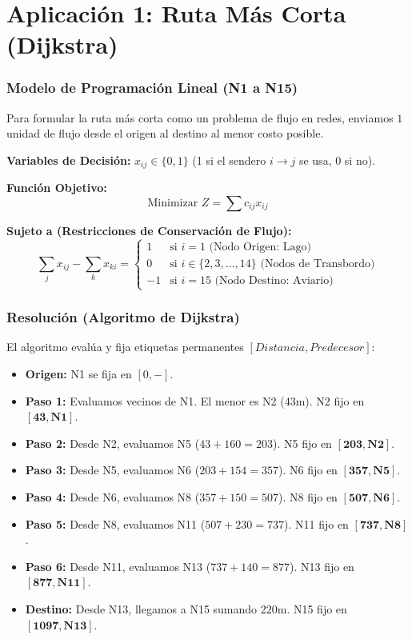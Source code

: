 \documentclass[aspectratio=169]{beamer}
\begin{document}
\section{Aplicación 1: Ruta Más Corta (Dijkstra)}

\begin{frame}
    \frametitle{Modelo de Programación Lineal (N1 a N15)}
    Para formular la ruta más corta como un problema de flujo en redes, 
    enviamos $1$ unidad de flujo desde el origen al destino al menor costo posible.
    
    \vspace{0.2cm}
    \textbf{Variables de Decisión:} $x_{ij} \in \{0,1\}$ (1 si el sendero $i \rightarrow j$ se usa, 0 si no).
    
    \textbf{Función Objetivo:}
    $$\text{Minimizar } Z = \sum c_{ij} x_{ij}$$
    
    \textbf{Sujeto a (Restricciones de Conservación de Flujo):}
    \begin{equation*}
    \sum_{j} x_{ij} - \sum_{k} x_{ki} = 
    \begin{cases} 
      1 & \text{si } i = 1 \text{ (Nodo Origen: Lago)} \\
      0 & \text{si } i \in \{2, 3, \dots, 14\} \text{ (Nodos de Transbordo)} \\
     -1 & \text{si } i = 15 \text{ (Nodo Destino: Aviario)}
    \end{cases}
    \end{equation*}
\end{frame}

\begin{frame}
    \frametitle{Resolución (Algoritmo de Dijkstra)}
    El algoritmo evalúa y fija etiquetas permanentes $[Distancia, Predecesor]$:
    \begin{itemize}
        \item \textbf{Origen:} N1 se fija en $[0, -]$.
        \item \textbf{Paso 1:} Evaluamos vecinos de N1. El menor es N2 (43m). N2 fijo en $\mathbf{[43, N1]}$.
        \item \textbf{Paso 2:} Desde N2, evaluamos N5 ($43+160=203$). N5 fijo en $\mathbf{[203, N2]}$.
        \item \textbf{Paso 3:} Desde N5, evaluamos N6 ($203+154=357$). N6 fijo en $\mathbf{[357, N5]}$.
        \item \textbf{Paso 4:} Desde N6, evaluamos N8 ($357+150=507$). N8 fijo en $\mathbf{[507, N6]}$.
        \item \textbf{Paso 5:} Desde N8, evaluamos N11 ($507+230=737$). N11 fijo en $\mathbf{[737, N8]}$.
        \item \textbf{Paso 6:} Desde N11, evaluamos N13 ($737+140=877$). N13 fijo en $\mathbf{[877, N11]}$.
        \item \textbf{Destino:} Desde N13, llegamos a N15 sumando 220m. N15 fijo en $\mathbf{[1097, N13]}$.
    \end{itemize}
\end{frame}
\end{document}
